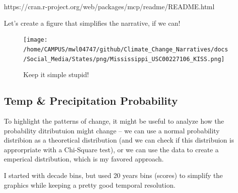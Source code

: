 \documentclass{article}
\begin{document}
https://cran.r-project.org/web/packages/mcp/readme/README.html



Let's create a figure that simplifies the narrative, if we can!

\begin{knitrout}
\color{fgcolor}\begin{kframe}


{\ttfamily\noindent\bfseries\color{errorcolor}{\#\# Error in seq(min(GSOM\$Year), max(GSOM\$Year), by = 2): object 'GSOM' not found}}\end{kframe}
\end{knitrout}

\begin{figure}
\texttt{[image: /home/CAMPUS/mwl04747/github/Climate\_Change\_Narratives/docs/Social\_Media/States/png/Mississippi\_USC00227106\_KISS.png]}
\caption{Keep it simple stupid!}
\label{fig:GSOM-KISS}
\end{figure}

\subsection{Temp \& Precipitation Probability}

To highlight the patterns of change, it might be useful to analyze how the probability ditributuion might change -- we can use a normal probability distribion as a theoretical distribution (and we can check if this distribuion is approrpriate with a Chi-Square test), or we can use the data to create a emperical distribution, which is my favored approach. 

I started with decade bins, but used 20 years bins (scores) to simplify the graphics while keeping a pretty good temporal resolution.
\end{document}

